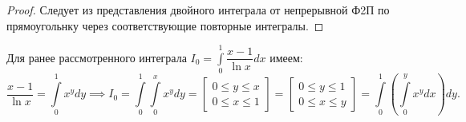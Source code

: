 \documentclass[../../main.tex]{subfiles}
\begin{document}
\begin{proof}
	Следует из представления двойного интеграла от непрерывной Ф2П по
	прямоугольнку через соответствующие повторные интегралы.
\end{proof}
\begin{exmp}
	Для ранее рассмотренного интеграла $I_0 = 
	\displaystyle\int\limits_0^1 \dfrac{x - 1}{\ln x} dx $ имеем:
	\[ \dfrac{x - 1}{\ln x} = \int\limits_0^1 x^y dy \implies I_0 = 
	\int\limits_0^1 \int\limits_0^x x^y dy = \left[
	\begin{gathered}
		0 \leq y \leq x\\
		0 \leq x \leq 1
	\end{gathered}
	\right] = \left[
	\begin{gathered}
		0 \leq y \leq 1\\
		0 \leq x \leq y
	\end{gathered}
	\right] = \int\limits_0^1 \left(\int\limits_0^y x^y dx\right)dy.
	\]
\end{exmp}
\end{document}
